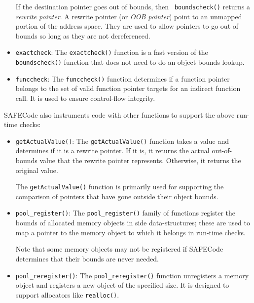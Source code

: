 \begin{itemize}
If the destination pointer goes out of bounds, then {\tt
boundscheck()} returns a \emph{rewrite pointer}.  A rewrite pointer
(or \emph{OOB pointer}) point to an unmapped portion of the address
space.  They are used to allow pointers to go out of bounds so long as
they are not dereferenced.

\item{\tt exactcheck}:
The {\tt exactcheck()} function is a fast version of the {\tt
boundscheck()} function that does not need to do an object bounds
lookup.

\item{\tt funccheck}:
The {\tt funccheck()} function determines if a function pointer
belongs to the set of valid function pointer targets for an indirect
function call.  It is used to ensure control-flow integrity.
\end{itemize}

SAFECode also instruments code with other functions to support the
above run-time checks:

\begin{itemize}
\item{\tt getActualValue()}:
The {\tt getActualValue()} function takes a value and determines if it
is a rewrite pointer.  If it is, it returns the actual out-of-bounds
value that the rewrite pointer represents.  Otherwise, it returns the
original value.

The {\tt getActualValue()} function is primarily used for supporting
the comparison of pointers that have gone outside their object bounds.

\item{\tt pool\_register()}:
The {\tt pool\_register()} family of functions register the bounds of
allocated memory objects in side data-structures; these are used to
map a pointer to the memory object to which it belongs in run-time
checks.

Note that some memory objects may not be registered if SAFECode determines
that their bounds are never needed.

\item{\tt pool\_reregister()}:
The {\tt pool\_reregister()} function unregisters a memory object and
registers a new object of the specified size.  It is designed to
support allocators like {\tt realloc()}.
\end{itemize}
